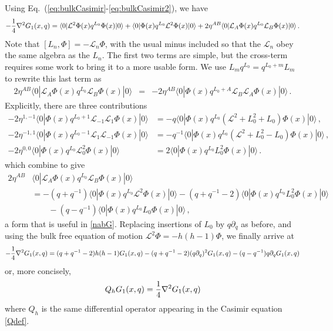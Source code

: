 \documentclass[12pt]{article}
\def\Lc{\mathcal{L}}
\def\p{\partial}
\newcommand{\bea}{\begin{eqnarray}}
\newcommand{\eea}{\end{eqnarray}}
\begin{document}
Using Eq.~(\ref{eq:bulkCasimir}-\ref{eq:bulkCasimir2}), we  have
%
\begin{equation}\label{nabG}
-{1\over 4}\nabla^2 G_1(x,q) = \langle 0| \Lc^2 \Phi(x) q^{L_0} \Phi(x)|0\rangle+ \langle 0| \Phi(x) q^{L_0}\Lc^2  \Phi(x)|0\rangle +2\eta^{AB}\langle 0|\Lc_A  \Phi(x) q^{L_0} \Lc_B \Phi(x)|0\rangle \,. \\
\end{equation}
%
Note that  $[L_n,\Phi]=-\Lc_n \Phi$, with the usual minus included so that the $\Lc_n$ obey the same algebra as the $L_n$. The first two terms are simple, but the cross-term requires some work to bring it to a more usable form.
We use $L_m q^{L_0} = q^{L_0+m}L_m$ to rewrite this last term as
%
\bea
2\eta^{AB}\langle 0|\Lc_A  \Phi(x) q^{L_0} \Lc_B \Phi(x)|0\rangle
&  = &-2\eta^{AB}\langle 0| \Phi(x)  q^{L_0+A}\Lc_B \Lc_A\Phi(x)|0\rangle\,.
\eea
%
Explicitly, there are three contributions
%
\begin{align}   -2\eta^{1,-1}\langle 0| \Phi(x)  q^{L_0+1}\Lc_{-1} \Lc_1\Phi(x)|0\rangle
&=  -q\langle 0| \Phi(x)  q^{L_0}(\Lc^2+L_0^2+L_0) \Phi(x)|0\rangle\,, \\
 -2\eta^{-1,1}\langle 0| \Phi(x)  q^{L_0-1}\Lc_{1} \Lc_{-1}\Phi(x)|0\rangle
&= -q^{-1}\langle 0| \Phi(x)  q^{L_0}(\Lc^2+L_0^2-L_0) \Phi(x)|0\rangle \,,\\
   -2\eta^{0,0}\langle 0| \Phi(x)  q^{L_0}\Lc_{0}^2 \Phi(x)|0\rangle &= 2\langle 0| \Phi(x)  q^{L_0}L_0^2 \Phi(x)|0\rangle \,.
\end{align}
%
which combine to give
%
\begin{align}
	2\eta^{AB}&\langle 0|\Lc_A  \Phi(x) q^{L_0} \Lc_B \Phi(x)|0\rangle \nonumber \\
& =-(q+q^{-1}) \langle 0| \Phi(x)  q^{L_0}\Lc^2 \Phi(x)|0\rangle -(q+q^{-1}-2)\langle 0| \Phi(x)  q^{L_0}L_0^2 \Phi(x)|0\rangle
\nonumber\\
&\qquad-(q-q^{-1}) \langle 0| \Phi(x)  q^{L_0}L_0 \Phi(x)|0\rangle \,,
\end{align}
%
a form that is useful in \cref{nabG}. Replacing insertions of $L_0$ by $q\p_q$ as before, and using the bulk free equation of motion $\Lc^2 \Phi = -h(h-1)\Phi$,
%
%
we finally arrive at
%
\begin{equation} -{1\over 4}\nabla^2 G_1(x,q) =(q+q^{-1}-2)h(h-1)G_1(x,q)-(q+q^{-1}-2)(q\p_q)^2 G_1(x,q) -(q-q^{-1})q\p_q G_1(x,q)    \end{equation}
%
or, more concisely,
%
\begin{equation}\label{Qeq} Q_h G_1(x,q) ={1\over 4}\nabla^2 G_1(x,q)  \end{equation}
%
where $ Q_h$ is the same differential operator appearing in the Casimir equation \cref{Qdef}.
%
%
\end{document}
